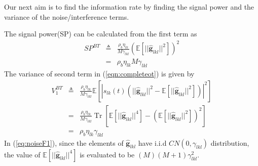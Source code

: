 \documentclass[10pt, a4paper, twoside,fleqn]{article}
\DeclareMathOperator{\Tr}{Tr}
\begin{document}
Our next aim is to find the information rate by finding the signal power and the variance of the noise/interference terms. 

The signal power(SP) can be calculated from the first term as
\begin{eqnarray}
	SP^{BT} &\triangleq&  \frac{\rho_b\eta_{lk}}{M\gamma_{lkl}}(\mathbb{E}[||\pmb{\hat g}_{lkl}||^2])^2 \nonumber \\
            &=& \rho_b\eta_{lk}M\gamma_{lkl}
\end{eqnarray}
The variance of second term in (\ref{eqn:completeot}) is given by
\begin{eqnarray}\label{eq:noiseF1}
	V_1^{BT} &\triangleq& \frac{\rho_b \eta_{lk}}{M\gamma_{lkl}}   \mathbb{E}[|s_{lk}(t)\left(||\pmb{\hat g}_{lkl}||^2- \mathbb{E}[||\pmb{\hat  g}_{lkl}||^2] \right)|^2] \nonumber \\
	    &=& \frac{\rho_b \eta_{lk}}{M\gamma_{lkl}}\Tr \left[\mathbb{E}[||\pmb{\hat g}_{lkl}||^4] - (\mathbb{E}[||\pmb{\hat g}_{lkl}||^2])^2 \right] \nonumber  \\
	    &=& \rho_b\eta_{lk}\gamma_{lkl}
\end{eqnarray}
In (\ref{eq:noiseF1}), since the elements of $\pmb{\hat g}_{lkl}$ have i.i.d  $CN(0,\gamma_{lkl})$ distribution, the value of $\mathbb{E}[||\pmb{\hat g}_{lkl}||^4]$ is evaluated to be $(M)(M+1)\gamma_{lkl}^2$.
\end{document}
